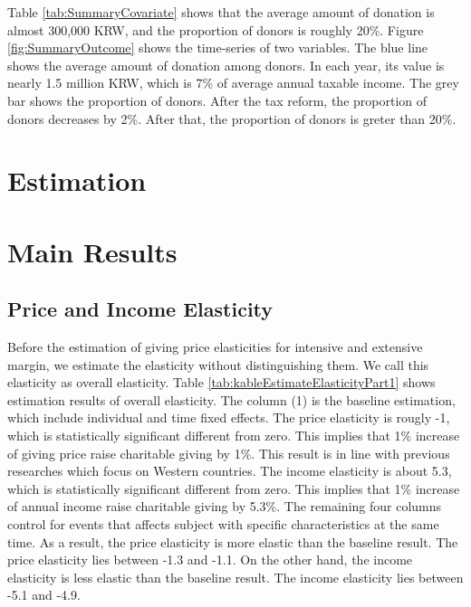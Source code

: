 \documentclass[
  11pt,
  a4paper,
]{article}
\begin{document}
  Table \ref{tab:SummaryCovariate} shows that
  the average amount of donation is almost 300,000 KRW,
  and the proportion of donors is roughly 20\%.
  Figure \ref{fig:SummaryOutcome} shows the time-series of two variables.
  The blue line shows the average amount of donation among donors.
  In each year, its value is nearly 1.5 million KRW,
  which is 7\% of average annual taxable income.
  The grey bar shows the proportion of donors.
  After the tax reform, the proportion of donors decreases by 2\%.
  After that, the proportion of donors is greter than 20\%.

  \hypertarget{estimation}{%
  \section{Estimation}\label{estimation}}

  \hypertarget{main-results}{%
  \section{Main Results}\label{main-results}}

  \hypertarget{price-and-income-elasticity}{%
  \subsection{Price and Income Elasticity}\label{price-and-income-elasticity}}

  Before the estimation of giving price elasticities for intensive and extensive margin, we estimate the elasticity without distinguishing them. We call this elasticity as overall elasticity.
  Table \ref{tab:kableEstimateElasticityPart1} shows estimation results of overall elasticity.
  The column (1) is the baseline estimation, which include individual and time fixed effects.
  The price elasticity is rougly -1, which is statistically significant different from zero.
  This implies that 1\% increase of giving price raise charitable giving by 1\%.
  This result is in line with previous researches which focus on Western countries.
  The income elasticity is about 5.3, which is statistically significant different from zero.
  This implies that 1\% increase of annual income raise charitable giving by 5.3\%.
  The remaining four columns control for events that affects subject with specific characteristics at the same time.
  As a result, the price elasticity is more elastic than the baseline result.
  The price elasticity lies between -1.3 and -1.1.
  On the other hand, the income elasticity is less elastic than the baseline result.
  The income elasticity lies between -5.1 and -4.9.
\end{document}
